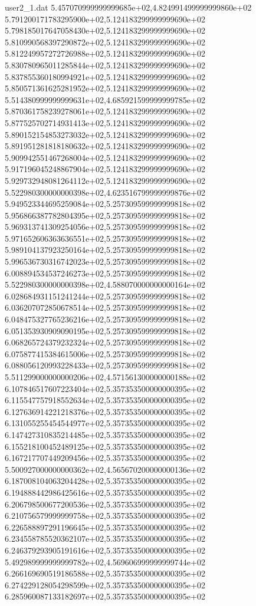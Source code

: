 \begin{filecontents}{user2_1.dat}
5.457070999999999685e+02,4.824991499999999860e+02
5.791200171783295900e+02,5.124183299999999690e+02
5.798185017647058430e+02,5.124183299999999690e+02
5.810990568397290872e+02,5.124183299999999690e+02
5.812249957272726988e+02,5.124183299999999690e+02
5.830780965011285844e+02,5.124183299999999690e+02
5.837855360180994921e+02,5.124183299999999690e+02
5.850571361625281952e+02,5.124183299999999690e+02
5.514380999999999631e+02,4.685921599999999785e+02
5.870361758239278061e+02,5.124183299999999690e+02
5.877525702714931413e+02,5.124183299999999690e+02
5.890152154853273032e+02,5.124183299999999690e+02
5.891951281818180632e+02,5.124183299999999690e+02
5.909942551467268004e+02,5.124183299999999690e+02
5.917196045248867904e+02,5.124183299999999690e+02
5.929732948081264112e+02,5.124183299999999690e+02
5.522980300000000398e+02,4.623516799999999876e+02
5.949523344695259084e+02,5.257309599999999818e+02
5.956866387782804395e+02,5.257309599999999818e+02
5.969313741309254056e+02,5.257309599999999818e+02
5.971652606363636551e+02,5.257309599999999818e+02
5.989104137923250164e+02,5.257309599999999818e+02
5.996536730316742023e+02,5.257309599999999818e+02
6.008894534537246273e+02,5.257309599999999818e+02
5.522980300000000398e+02,4.588070000000000164e+02
6.028684931151241244e+02,5.257309599999999818e+02
6.036207072850678514e+02,5.257309599999999818e+02
6.048475327765236216e+02,5.257309599999999818e+02
6.051353930909090195e+02,5.257309599999999818e+02
6.068265724379232324e+02,5.257309599999999818e+02
6.075877415384615006e+02,5.257309599999999818e+02
6.088056120993228433e+02,5.257309599999999818e+02
5.511299000000000206e+02,4.571561300000000188e+02
6.107846517607223404e+02,5.357353500000000395e+02
6.115547757918552634e+02,5.357353500000000395e+02
6.127636914221218376e+02,5.357353500000000395e+02
6.131055255454544977e+02,5.357353500000000395e+02
6.147427310835214485e+02,5.357353500000000395e+02
6.155218100452489125e+02,5.357353500000000395e+02
6.167217707449209456e+02,5.357353500000000395e+02
5.500927000000000362e+02,4.565670200000000136e+02
6.187008104063204428e+02,5.357353500000000395e+02
6.194888442986425616e+02,5.357353500000000395e+02
6.206798500677200536e+02,5.357353500000000395e+02
6.210756579999999758e+02,5.357353500000000395e+02
6.226588897291196645e+02,5.357353500000000395e+02
6.234558785520362107e+02,5.357353500000000395e+02
6.246379293905191616e+02,5.357353500000000395e+02
5.492989999999999782e+02,4.569606999999999744e+02
6.266169690519186588e+02,5.357353500000000395e+02
6.274229128054298599e+02,5.357353500000000395e+02
6.285960087133182697e+02,5.357353500000000395e+02

\end{filecontents}
